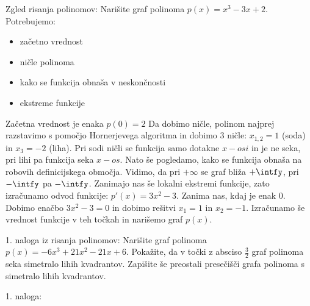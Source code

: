 \begin{vaja}
Zgled risanja polinomov:
Narišite graf polinoma $p(x)=x^3-3x+2$.
Potrebujemo:
\begin{itemize}
\item začetno vrednost
\item ničle polinoma
\item kako se funkcija obnaša v neskončnosti
\item ekstreme funkcije
\end{itemize}

Začetna vrednost je enaka $p(0)=2$
Da dobimo ničle, polinom najprej razstavimo s pomočjo Hornerjevega algoritma in dobimo 3 ničle:
$x_{1,2}=1$ (soda) in $x_3=-2$ (liha). Pri sodi ničli se funkcija samo dotakne $x-osi$ in je ne seka, pri lihi pa
funkcija seka $x-os$.
Nato še pogledamo, kako se funkcija obnaša na robovih definicijskega območja. Vidimo, da pri $+\infty$ se graf bliža $+\intfy$,
pri $-\intfy$ pa $-\intfy$.
Zanimajo nas še lokalni ekstremi funkcije, zato izračunamo odvod funkcije: $p\prime(x)=3x^2-3$. Zanima nas, kdaj je enak $0$. Dobimo enačbo $3x^2-3=0$ in dobimo rešitvi $x_1=1$ in $x_2=-1$. Izračunamo še vrednost funkcije v teh točkah in narišemo graf $p(x)$.
\end{vaja}

\begin{vaja}
1. naloga iz risanja polinomov:
Narišite graf polinoma $p(x)=-6x^3+21x^2-21x+6$. Pokažite, da v točki z absciso $\frac{3}{2}$ graf polinoma 
seka simetralo lihih kvadrantov. Zapišite še preostali presečišči grafa polinoma s simetralo lihih kvadrantov.



  \begin{odgovor}
1. naloga: %

  \end{odgovor}

\end{vaja}



